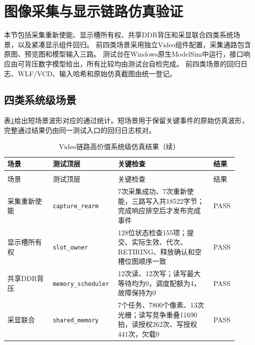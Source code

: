 \section{图像采集与显示链路仿真验证}

本节包括采集重新使能、显示槽所有权、共享DDR背压和采显联合四类系统场景，以及紧凑显示组件回归。
前四类场景采用独立Video组件配置，采集通路包含原图、预览图和模型输入三路。
测试台在Windows原生ModelSim中运行，接口响应由可背压数字模型给出，所有比较均由测试台自检完成。
前四类场景的回归日志、WLF/VCD、输入哈希和原始仿真截图由统一登记。

\subsection{四类系统级场景}

表\ref{tbl:video-high-value-sim}给出短场景波形对应的通过统计。短场景用于保留关键事件的原始仿真波形，完整通过结果仍由同一测试入口的回归日志核对。

\begin{reporttable}
\begin{longtable}{@{}p{0.19\linewidth}p{0.24\linewidth}p{0.40\linewidth}p{0.10\linewidth}@{}}
\caption{Video链路高价值系统级仿真结果}\label{tbl:video-high-value-sim}\\
\toprule
场景 & 测试顶层 & 关键检查 & 结果 \\
\midrule
\endfirsthead
\caption[]{Video链路高价值系统级仿真结果（续）}\\
\toprule
场景 & 测试顶层 & 关键检查 & 结果 \\
\midrule
\endhead
\bottomrule
\endfoot
采集重新使能 & \texttt{capture\_\allowbreak rearm} & 7次采集成功、7次重新使能，三路写入共18522字节；完成响应排空后才发布完成事件 & PASS \\
显示槽所有权 & \texttt{slot\_\allowbreak owner} & 128位状态检查155项；提交、实际生效、代次、RETIRING、释放确认和空槽位图顺序一致 & PASS \\
共享DDR背压 & \texttt{memory\_\allowbreak scheduler} & 12次读、12次写；读写最大等待均为0，调度配额为4，故障保持为0 & PASS \\
采显联合 & \texttt{shared\_\allowbreak memory} & 7个任务、7800个像素、13次光栅；读写竞争重叠11690拍，读授权262次、写授权441次，欠载0 & PASS \\
\end{longtable}
\end{reporttable}

